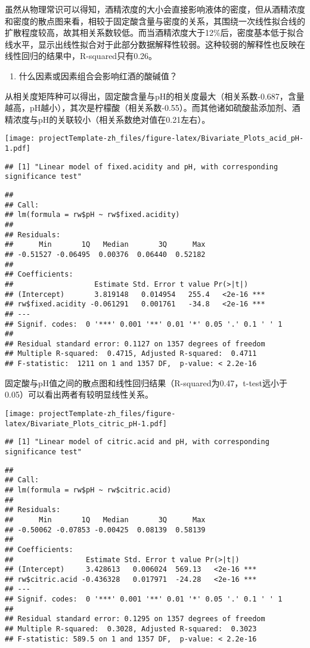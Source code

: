 \documentclass[]{article}
\providecommand{\tightlist}{%
  \setlength{\itemsep}{0pt}\setlength{\parskip}{0pt}}
\begin{document}
虽然从物理常识可以得知，酒精浓度的大小会直接影响液体的密度，但从酒精浓度和密度的散点图来看，相较于固定酸含量与密度的关系，其围绕一次线性拟合线的扩散程度较高，故其相关系数较低。而当酒精浓度大于12\%后，密度基本低于拟合线水平，显示出线性拟合对于此部分数据解释性较弱。这种较弱的解释性也反映在线性回归的结果中，R-squared只有0.26。

\begin{enumerate}
\def\labelenumi{\arabic{enumi}.}
\setcounter{enumi}{2}
\tightlist
\item
  什么因素或因素组合会影响红酒的酸碱值？
\end{enumerate}

从相关度矩阵种可以得出，固定酸含量与pH的相关度最大（相关系数-0.687，含量越高，pH越小），其次是柠檬酸（相关系数-0.55）。而其他诸如硫酸盐添加剂、酒精浓度与pH的关联较小（相关系数绝对值在0.21左右）。

\texttt{[image: projectTemplate-zh\_files/figure-latex/Bivariate\_Plots\_acid\_pH-1.pdf]}

\begin{verbatim}
## [1] "Linear model of fixed.acidity and pH, with corresponding significance test"
\end{verbatim}

\begin{verbatim}
## 
## Call:
## lm(formula = rw$pH ~ rw$fixed.acidity)
## 
## Residuals:
##      Min       1Q   Median       3Q      Max 
## -0.51527 -0.06495  0.00376  0.06440  0.52182 
## 
## Coefficients:
##                   Estimate Std. Error t value Pr(>|t|)    
## (Intercept)       3.819148   0.014954   255.4   <2e-16 ***
## rw$fixed.acidity -0.061291   0.001761   -34.8   <2e-16 ***
## ---
## Signif. codes:  0 '***' 0.001 '**' 0.01 '*' 0.05 '.' 0.1 ' ' 1
## 
## Residual standard error: 0.1127 on 1357 degrees of freedom
## Multiple R-squared:  0.4715, Adjusted R-squared:  0.4711 
## F-statistic:  1211 on 1 and 1357 DF,  p-value: < 2.2e-16
\end{verbatim}

固定酸与pH值之间的散点图和线性回归结果（R-squared为0.47，t-test远小于0.05）可以看出两者有较明显线性关系。

\texttt{[image: projectTemplate-zh\_files/figure-latex/Bivariate\_Plots\_citric\_pH-1.pdf]}

\begin{verbatim}
## [1] "Linear model of citric.acid and pH, with corresponding significance test"
\end{verbatim}

\begin{verbatim}
## 
## Call:
## lm(formula = rw$pH ~ rw$citric.acid)
## 
## Residuals:
##      Min       1Q   Median       3Q      Max 
## -0.50062 -0.07853 -0.00425  0.08139  0.58139 
## 
## Coefficients:
##                 Estimate Std. Error t value Pr(>|t|)    
## (Intercept)     3.428613   0.006024  569.13   <2e-16 ***
## rw$citric.acid -0.436328   0.017971  -24.28   <2e-16 ***
## ---
## Signif. codes:  0 '***' 0.001 '**' 0.01 '*' 0.05 '.' 0.1 ' ' 1
## 
## Residual standard error: 0.1295 on 1357 degrees of freedom
## Multiple R-squared:  0.3028, Adjusted R-squared:  0.3023 
## F-statistic: 589.5 on 1 and 1357 DF,  p-value: < 2.2e-16
\end{verbatim}
\end{document}
